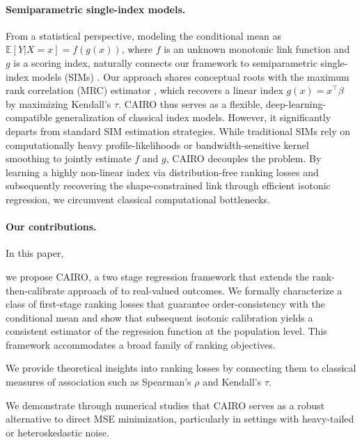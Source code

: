 \documentclass[11pt]{article}
\theoremstyle{plain}
\theoremstyle{plain}
\theoremstyle{plain}
\theoremstyle{plain}
\theoremstyle{plain}
\theoremstyle{plain}
\theoremstyle{plain}
\begin{document}
\paragraph{Semiparametric single-index models.}

From a statistical perspective, modeling the conditional mean as $\mathbb{E}[Y| X=x] = f(g(x))$, where $f$ is an unknown monotonic link function and $g$ is a scoring index, naturally connects our framework to semiparametric single-index models (SIMs) \citep{hardle1993optimal,hardle1989investigating,ichimura1993semiparametric}. Our approach shares  conceptual roots with the maximum rank correlation (MRC) estimator \citep{han1987non}, which recovers a linear index $g(x) = x^\top \beta$ by maximizing Kendall's $\tau$. \textsc{CAIRO} thus serves as a flexible, deep-learning-compatible generalization of classical index models. However, it significantly departs from standard SIM estimation strategies. While traditional SIMs rely on computationally heavy profile-likelihoods or bandwidth-sensitive kernel smoothing to jointly estimate $f$ and $g$, \textsc{CAIRO} decouples the problem. By learning a highly non-linear index via distribution-free ranking losses and subsequently recovering the shape-constrained link through efficient isotonic regression, we circumvent classical computational bottlenecks.



\paragraph{Our contributions.} 

In this paper, \begin{enumerate*}[label=(\roman*)] 
\item we propose \textsc{CAIRO}, a two stage regression framework that extends the rank-then-calibrate approach of \citet{menon2012predicting} to real-valued outcomes. We formally characterize a class of first-stage ranking losses that guarantee order-consistency with the conditional mean and show that subsequent isotonic calibration yields a consistent estimator of the regression function at the population level. This framework accommodates a broad family of ranking objectives.
\item We provide theoretical insights into ranking losses by connecting them to classical measures of association such as Spearman's $\rho$ and Kendall's $\tau$. 
\item  We demonstrate through numerical studies that \textsc{CAIRO} serves as a robust alternative to direct MSE minimization, particularly in settings with heavy-tailed or heteroskedastic noise. \end{enumerate*}
\end{document}
